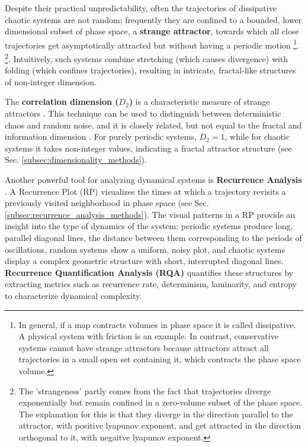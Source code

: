 \documentclass[a4paper,12pt]{article}
\begin{document}
Despite their practical unpredictability, often the trajectories of dissipative chaotic systems are not random; frequently they are confined to a bounded, lower dimensional subset of phase space, a \textbf{strange attractor}, towards which all close trajectories get asymptotically attracted but without having a periodic motion \footnote{In general, if a map contracts volumes in phase space it is called dissipative. A physical system with friction is an example. In contrast, conservative systems cannot have strange attractors because attractors attract all trajectories in a small open set containing it, which contracts the phase space volume.}.
\footnote{The 'strangeness' partly comes from the fact that trajectories diverge exponentially but remain confined in a zero-volume subset of the phase space. The explanation for this is that they diverge in the direction parallel to the attractor, with positive lyapunov exponent, and get attracted in the direction orthogonal to it, with negaitve lyapunov exponent.}.
Intuitively, such systems combine stretching (which causes divergence) with folding (which confines trajectories), resulting in intricate, fractal-like structures of non-integer dimension. 

The \textbf{correlation dimension ($D_2$)} is a characteristic measure of strange attractors \cite{GRASSBERGER1983189}. This technique can be used to distinguish between deterministic chaos and random noise, and it is closely related, but not equal to the fractal and information dimension \cite{GRASSBERGER1983189}. For purely periodic systems, $D_2 = 1$, while for chaotic systems it takes non-integer values, indicating a fractal attractor structure (see Sec. \ref{subsec:dimensionality_methods}).

Another powerful tool for analyzing dynamical systems is \textbf{Recurrence Analysis} \cite{MARWAN2007237}. A Recurrence Plot (RP) visualizes the times at which a trajectory revisits a previously visited neighborhood in phase space (see Sec. \ref{subsec:recurrence_analysis_methods}). %
The visual patterns in a RP provide an insight into the type of dynamics of the system: periodic systems produce long, parallel diagonal lines, the distance between them corresponding to the periods of oscillations, random systems show a uniform, noisy plot, and chaotic systems display a complex geometric structure with short, interrupted diagonal lines. \textbf{Recurrence Quantification Analysis (RQA)} quantifies these structures by extracting metrics such as recurrence rate, determinism, laminarity, and entropy to characterize dynamical complexity.
\end{document}

